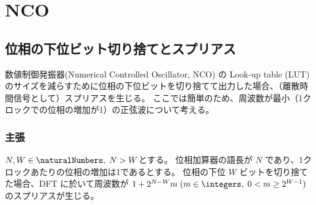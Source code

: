\chapter{NCO}
    \section{位相の下位ビット切り捨てとスプリアス}
        数値制御発振器(Numerical Controlled Oscillator, NCO) の Look-up table (LUT) のサイズを減らすために位相の下位ビットを切り捨てて出力した場合、（離散時間信号として）スプリアスを生じる。
        ここでは簡単のため、周波数が最小（1クロックでの位相の増加が1）の正弦波について考える。
        \subsection{主張}
            \begin{shadebox}
                $N,W\in\naturalNumbers,\;N>W$とする。
                位相加算器の語長が $N$ であり、1クロックあたりの位相の増加は1であるとする。
                位相の下位 $W$ ビットを切り捨てた場合、DFT に於いて周波数が $1 + 2^{N-W}m\;(m\in\integers,\;0<m\geq 2^{W-1})$ のスプリアスが生じる。
            \end{shadebox}
